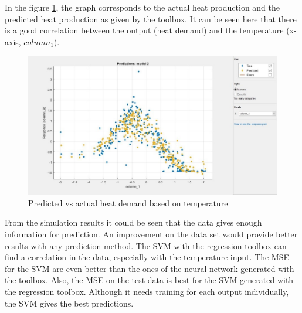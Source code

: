 In the figure \ref{fig:Predicvsactual_temp}, the graph corresponds to the actual heat production and the predicted heat production as given by the toolbox. It can be seen here that there is a good correlation between the output (heat demand) and the temperature (x-axis, $column_{1}$).

\begin{figure}[H]
	\centering
	\includegraphics[width=1.0\columnwidth]{Pictures/predicvsheardemand temp.jpg}
	\caption[Short title]{Predicted vs actual heat demand based on temperature}
	\label{fig:Predicvsactual_temp}
	\end{figure}
	
From the simulation results it could be seen that the data gives enough information for prediction. An improvement on the data set would provide better results with any prediction method.
The SVM with the regression toolbox can find a correlation in the data, especially with the temperature input. The MSE for the SVM are even better than the ones of the neural network generated with the toolbox. Also, the MSE on the test data is best for the SVM generated with the regression toolbox. Although it needs training for each output individually, the SVM gives the best predictions.

\newpage
	
	
